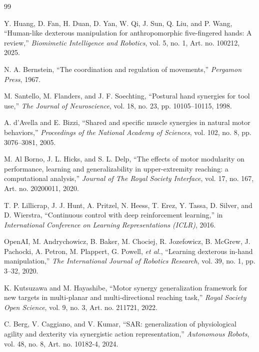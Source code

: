 \documentclass[letterpaper, 10 pt, conference]{ieeeconf}  %
\begin{document}
\begin{thebibliography}{99}

        Y. Huang, D. Fan, H. Duan, D. Yan, W. Qi, J. Sun, Q. Liu, and P. Wang, ``Human-like dexterous manipulation for anthropomorphic five-fingered hands: A review,'' \emph{Biomimetic Intelligence and Robotics}, vol. 5, no. 1, Art. no. 100212, 2025.

        N. A. Bernstein, ``The coordination and regulation of movements,'' \emph{Pergamon Press}, 1967.
        
        M. Santello, M. Flanders, and J. F. Soechting, ``Postural hand synergies for tool use,'' \emph{The Journal of Neuroscience}, vol. 18, no. 23, pp. 10105--10115, 1998.

        A. d'Avella and E. Bizzi, ``Shared and specific muscle synergies in natural motor behaviors,'' \emph{Proceedings of the National Academy of Sciences}, vol. 102, no. 8, pp. 3076--3081, 2005.

        M. Al Borno, J. L. Hicks, and S. L. Delp, ``The effects of motor modularity on performance, learning and generalizability in upper-extremity reaching: a computational analysis,'' \emph{Journal of The Royal Society Interface}, vol. 17, no. 167, Art. no. 20200011, 2020.

        T. P. Lillicrap, J. J. Hunt, A. Pritzel, N. Heess, T. Erez, Y. Tassa, D. Silver, and D. Wierstra, ``Continuous control with deep reinforcement learning,'' in \emph{International Conference on Learning Representations (ICLR)}, 2016.

        OpenAI, M. Andrychowicz, B. Baker, M. Chociej, R. Jozefowicz, B. McGrew, J. Pachocki, A. Petron, M. Plappert, G. Powell, \emph{et al.}, ``Learning dexterous in-hand manipulation,'' \emph{The International Journal of Robotics Research}, vol. 39, no. 1, pp. 3--32, 2020.

        K. Kutsuzawa and M. Hayashibe, ``Motor synergy generalization framework for new targets in multi-planar and multi-directional reaching task,'' \emph{Royal Society Open Science}, vol. 9, no. 3, Art. no. 211721, 2022.

        C. Berg, V. Caggiano, and V. Kumar, ``SAR: generalization of physiological agility and dexterity via synergistic action representation,'' \emph{Autonomous Robots}, vol. 48, no. 8, Art. no. 10182-4, 2024.


\end{thebibliography}
\end{document}

